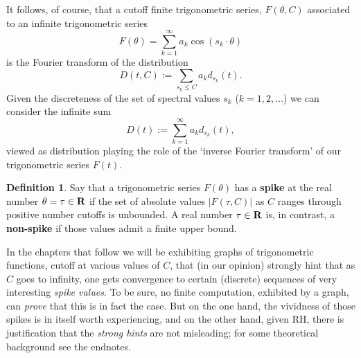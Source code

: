 \documentclass[openany]{book}
\theoremstyle{plain}
\theoremstyle{definition}
\newtheorem{definition}[theorem]{Definition}
\begin{document}
{It follows, of course, that a cutoff finite trigonometric series,
$F(\theta,C)$ associated to an infinite trigonometric series
$$
 F(\theta) = \sum_{k=1}^{\infty} a_k\cos(s_k\cdot \theta)
$$
is the Fourier transform of the distribution
$$
 D(t,C):=\sum_{s_k \le C}a_kd_{s_k}(t).
$$
Given the discreteness of the set of spectral values $s_k$ ($k=1,2,\dots$)    we can
consider the infinite sum
$$
 D(t):=\sum_{k=1}^{\infty}a_kd_{s_k}(t),
$$ viewed as distribution playing the role of
the `inverse Fourier transform' of our trigonometric
series $F(t)$.




\begin{definition} Say
  that a trigonometric series $F(\theta)$ has a {\bf spike} at the real number $\theta=\tau \in {\bf R}$
if the set of absolute values $|F(\tau,C)|$  as $C$ ranges through positive number cutoffs is
  unbounded.  A real number $\tau \in {\bf R}$ is, in contrast, a {\bf
    non-spike} if those values admit a finite upper
  bound. \end{definition}




 In the chapters that follow we will be exhibiting graphs of trigonometric functions, cutoff at various values of $C$, that (in our opinion) strongly hint that as $C$ goes to infinity, one gets convergence to certain (discrete) sequences of very interesting {\it spike values}. To be sure, no finite computation, exhibited by a graph, can {\it prove} that this is in fact the case. But on the one hand, the vividness of those spikes is in itself worth experiencing, and on the other hand, given RH, there is justification that the {\it strong hints} are not misleading; for some theoretical background see the endnotes.



}
\end{document}
